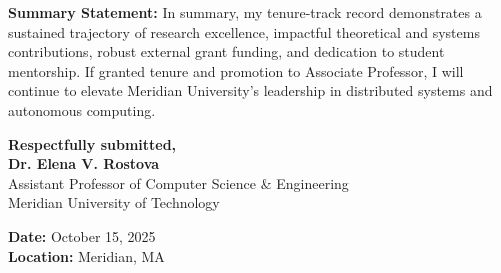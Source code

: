 \documentclass[11pt, a4paper, parskip=half]{scrartcl}
\begin{document}
\vspace{0.3em}

\begin{summarybox}
  \sffamily\small
  \textbf{Summary Statement:} In summary, my tenure-track record demonstrates a sustained trajectory of research excellence, impactful theoretical and systems contributions, robust external grant funding, and dedication to student mentorship. If granted tenure and promotion to Associate Professor, I will continue to elevate Meridian University's leadership in distributed systems and autonomous computing.
  
  \vspace{0.3em}
  
  \begin{minipage}[t]{0.5\textwidth}
    \textbf{Respectfully submitted,} \\[0.6em]
    \textbf{Dr. Elena V. Rostova} \\
    Assistant Professor of Computer Science \& Engineering \\
    Meridian University of Technology
  \end{minipage}%
  \begin{minipage}[t]{0.5\textwidth}
    \raggedleft
    \textbf{Date:} October 15, 2025 \\
    \textbf{Location:} Meridian, MA
  \end{minipage}
\end{summarybox}
\end{document}

